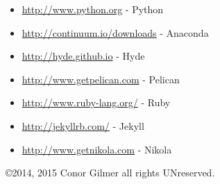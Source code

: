 \documentclass[12pt]{article}			%
\begin{document}
\begin{itemize}
\item\url{http://www.python.org} - Python
\item\url{http://continuum.io/downloads} - Anaconda
\item\url{http://hyde.github.io} - Hyde
\item\url{http://www.getpelican.com} - Pelican
\item\url{http://www.ruby-lang.org/} - Ruby
\item\url{http://jekyllrb.com/} - Jekyll
\item\url{http://www.getnikola.com} - Nikola
\end{itemize}

\copyright 2014, 2015 Conor Gilmer  all rights UNreserved.
\end{document}
